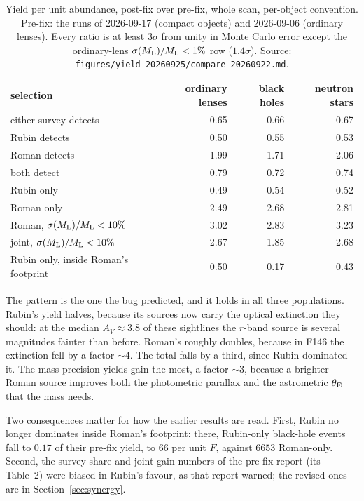 \documentclass[english,10pt,a4paper]{article}
\newcommand{\tetE}{\theta_{\rm E}}
\newcommand{\Ml}{M_{\rm L}}
\begin{document}
\begin{table}[h]
\centering
\caption{Yield per unit abundance, post-fix over pre-fix, whole scan, per-object convention.
Pre-fix: the runs of 2026-09-17 (compact objects) and 2026-09-06 (ordinary lenses). Every ratio
is at least $3\sigma$ from unity in Monte Carlo error except the ordinary-lens
$\sigma(\Ml)/\Ml<1\%$ row ($1.4\sigma$). Source: \texttt{figures/yield\_20260925/compare\_20260922.md}.}
\label{tab:fix}
\begin{tabular}{lrrr}
\toprule
selection & ordinary lenses & black holes & neutron stars \\
\midrule
either survey detects        & 0.65 & 0.66 & 0.67 \\
Rubin detects                & 0.50 & 0.55 & 0.53 \\
Roman detects                & 1.99 & 1.71 & 2.06 \\
both detect                  & 0.79 & 0.72 & 0.74 \\
Rubin only                   & 0.49 & 0.54 & 0.52 \\
Roman only                   & 2.49 & 2.68 & 2.81 \\
Roman, $\sigma(\Ml)/\Ml<10\%$ & 3.02 & 2.83 & 3.23 \\
joint, $\sigma(\Ml)/\Ml<10\%$ & 2.67 & 1.85 & 2.68 \\
\midrule
Rubin only, inside Roman's footprint & 0.50 & 0.17 & 0.43 \\
\bottomrule
\end{tabular}
\end{table}

The pattern is the one the bug predicted, and it holds in all three populations. Rubin's yield
halves, because its sources now carry the optical extinction they should: at the median
$A_V\approx3.8$ of these sightlines the $r$-band source is several magnitudes fainter than before.
Roman's roughly doubles, because in F146 the extinction fell by a factor $\sim\!4$. The total
falls by a third, since Rubin dominated it. The mass-precision yields gain the most, a factor
$\sim\!3$, because a brighter Roman source improves both the photometric parallax and the
astrometric $\tetE$ that the mass needs.

Two consequences matter for how the earlier results are read. First, Rubin no longer dominates
inside Roman's footprint: there, Rubin-only black-hole events fall to $0.17$ of their pre-fix
yield, to $66$ per unit $F$, against $6653$ Roman-only. Second, the survey-share and joint-gain
numbers of the pre-fix report (its Table~2) were biased in Rubin's favour, as that report
warned; the revised ones are in Section~\ref{sec:synergy}.
\end{document}
